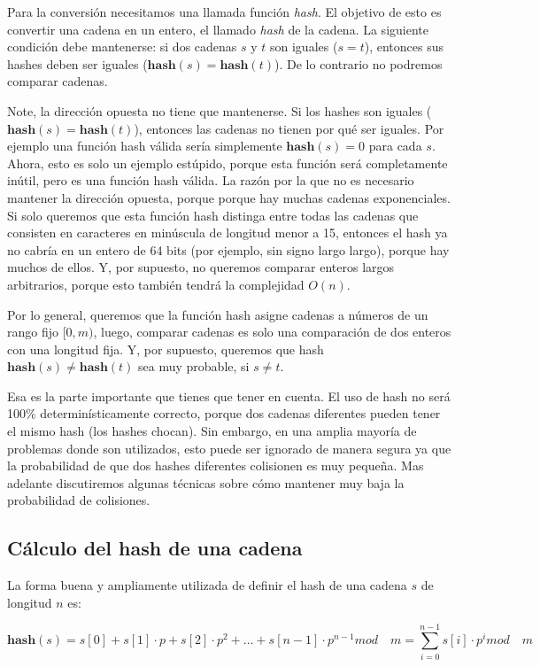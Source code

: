 Para la conversión necesitamos una llamada función \emph{hash}. El objetivo de esto es convertir una cadena en un entero, el llamado \emph{hash} de la cadena. La siguiente condición debe mantenerse: si dos cadenas $s$ y $t$ son iguales ($s=t$), entonces sus hashes deben ser iguales ($\textbf{hash}(s) = \textbf{hash}(t)$). De lo contrario no podremos comparar cadenas.

Note, la dirección opuesta no tiene que mantenerse. Si los hashes son iguales ($\textbf{hash}(s) = \textbf{hash}(t)$), entonces las cadenas no tienen por qué ser iguales. Por ejemplo una función hash válida sería simplemente $\textbf{hash}(s) = 0$ para cada $s$. Ahora, esto es solo un ejemplo estúpido, porque esta función será completamente inútil, pero es una función hash válida. La razón por la que no es necesario mantener la dirección opuesta, porque porque hay muchas cadenas exponenciales. Si solo queremos que esta función hash distinga entre todas las cadenas que consisten en caracteres en minúscula de longitud menor a 15, entonces el hash ya no cabría en un entero de 64 bits (por ejemplo, sin signo largo largo), porque hay muchos de ellos. Y, por supuesto, no queremos comparar enteros largos arbitrarios, porque esto también tendrá la complejidad $O(n)$.

Por lo general, queremos que la función hash asigne cadenas a números de un rango fijo $[0, m)$, luego, comparar cadenas es solo una comparación de dos enteros con una longitud fija. Y, por supuesto, queremos que hash $\textbf{hash}(s) \neq \textbf{hash}(t)$  sea muy probable, si $s \neq t$.

Esa es la parte importante que tienes que tener en cuenta. El uso de hash no será 100\% determinísticamente correcto, porque dos cadenas diferentes pueden tener el mismo hash (los hashes chocan). Sin embargo, en una amplia mayoría de problemas donde son utilizados, esto puede ser ignorado de manera segura ya que la probabilidad de que dos hashes diferentes colisionen es muy pequeña. Mas adelante discutiremos algunas técnicas  sobre cómo mantener muy baja la probabilidad de colisiones.

\subsection{Cálculo del hash de una cadena}
La forma buena y ampliamente utilizada de definir el hash de una cadena $s$ de longitud $n$ es:

$$\textbf{hash}(s) = s[0] + s[1] \cdot p + s[2] \cdot p^2 + ... + s[n-1] \cdot p^{n-1} mod \quad  m = \sum_{i=0}^{n-1} s[i] \cdot p^i mod \quad m $$

